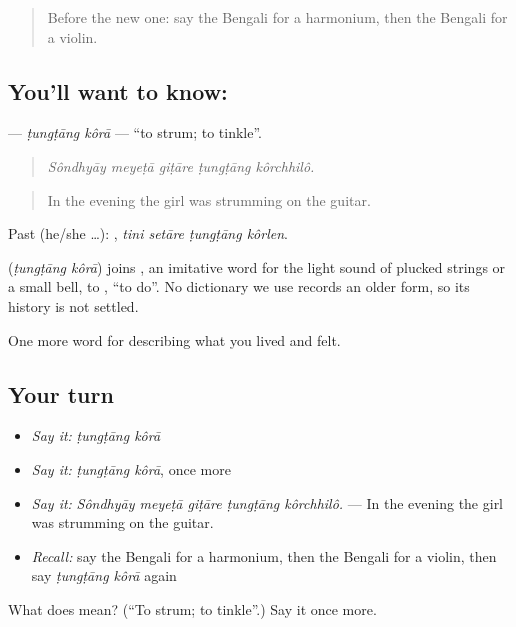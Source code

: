 \label{lesson:BN-C526-tungtang-kora}



\begin{quote}
Before the new one: say the Bengali for a harmonium, then the Bengali for a violin.
\end{quote}

\subsection*{You'll want to know:  }
\textbf{ } — \emph{ṭungṭāng kôrā} — \textquotedblleft{}to strum; to tinkle\textquotedblright{}.

\begin{quote}
    
\end{quote}

\begin{quote}
\emph{Sôndhyāy meyeṭā giṭāre ṭungṭāng kôrchhilô.}
\end{quote}

\begin{quote}
In the evening the girl was strumming on the guitar.
\end{quote}

Past (he/she …):    , \emph{tini setāre ṭungṭāng kôrlen}.

\begin{cousinweb}
\textbf{ } (\emph{ṭungṭāng kôrā}) joins , an imitative word for the light sound of plucked strings or a small bell, to , \textquotedblleft{}to do\textquotedblright{}. No dictionary we use records an older form, so its history is not settled.
\end{cousinweb}

\begin{grammarlens}[title={What you've built}]
One more word for describing what you lived and felt.
\end{grammarlens}

\subsection*{Your turn}
\begin{itemize}
\raggedright
  \item \emph{Say it:} \emph{ṭungṭāng kôrā}
  \item \emph{Say it:} \emph{ṭungṭāng kôrā}, once more
  \item \emph{Say it:} \emph{Sôndhyāy meyeṭā giṭāre ṭungṭāng kôrchhilô.} — In the evening the girl was strumming on the guitar.
  \item \emph{Recall:} say the Bengali for a harmonium, then the Bengali for a violin, then say \emph{ṭungṭāng kôrā} again
\end{itemize}

\begin{tcolorbox}[breakable,colback=teal!4,colframe=teal!35!black,title={Before you move on}]
What does   mean? (\textquotedblleft{}To strum; to tinkle\textquotedblright{}.) Say it once more.
\end{tcolorbox}
